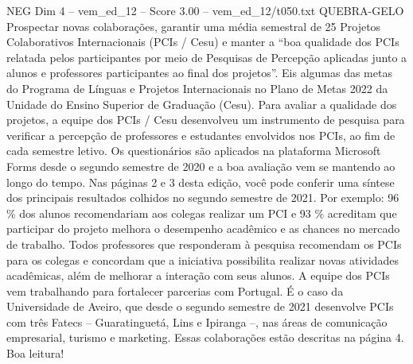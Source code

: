 \begin{textsample}{NEG Dim 4 – vem\_ed\_12 – Score 3.00 – vem\_ed\_12/t050.txt}  \label{ex:f4_neg_039}
QUEBRA-GELO Prospectar novas colaborações, garantir uma média semestral de 25 Projetos Colaborativos Internacionais (PCIs / Cesu) e manter a “boa qualidade dos PCIs relatada pelos participantes por meio de Pesquisas de Percepção aplicadas junto a alunos e professores participantes ao final dos projetos”.
Eis algumas das metas do Programa de Línguas e Projetos Internacionais no Plano de Metas 2022 da Unidade do Ensino Superior de Graduação (Cesu).
Para avaliar a qualidade dos projetos, a equipe dos PCIs / Cesu desenvolveu um instrumento de pesquisa para verificar a percepção de professores e estudantes envolvidos nos PCIs, ao fim de cada semestre letivo.
Os questionários são aplicados na plataforma Microsoft Forms desde o segundo semestre de 2020 e a boa avaliação vem se mantendo ao longo do tempo.
Nas páginas 2 e 3 desta edição, você pode conferir uma síntese dos principais resultados colhidos no segundo semestre de 2021.
Por exemplo: 96 \% dos alunos recomendariam aos colegas realizar um PCI e 93 \% acreditam que participar do projeto melhora o desempenho acadêmico e as chances no mercado de trabalho.
Todos professores que responderam à pesquisa recomendam os PCIs para os colegas e concordam que a iniciativa possibilita realizar novas atividades acadêmicas, além de melhorar a interação com seus alunos.
A equipe dos PCIs vem trabalhando para fortalecer parcerias com Portugal.
É o caso da Universidade de Aveiro, que desde o segundo semestre de 2021 desenvolve PCIs com três Fatecs – Guaratinguetá, Lins e Ipiranga –, nas áreas de comunicação empresarial, turismo e marketing.
Essas colaborações estão descritas na página 4.
Boa leitura!

\end{textsample}
